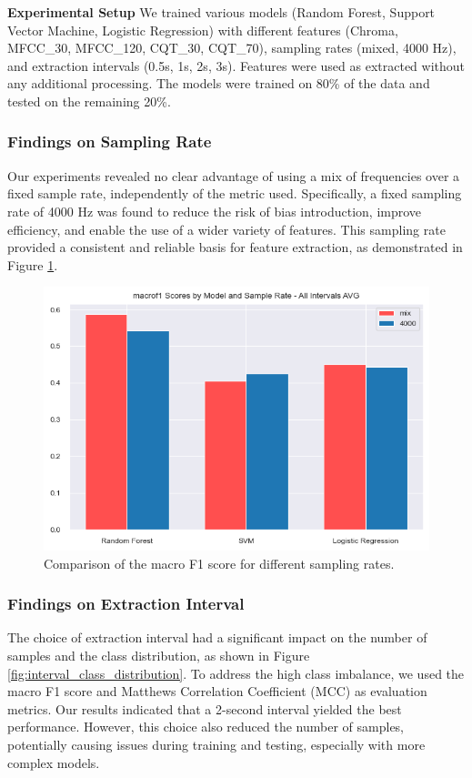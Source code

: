 \textbf{Experimental Setup}\newline
We trained various models (Random Forest, Support Vector Machine, Logistic Regression) with different features (Chroma, MFCC\_30, MFCC\_120, CQT\_30, CQT\_70),
sampling rates (mixed, 4000 Hz), and extraction intervals (0.5s, 1s, 2s, 3s). Features were used as extracted without any additional processing. 
The models were trained on 80\% of the data and tested on the remaining 20\%.

\subsubsection{Findings on Sampling Rate}
Our experiments revealed no clear advantage of using a mix of frequencies over a fixed sample rate, independently of the metric used.
Specifically, a fixed sampling rate of 4000 Hz was found to reduce the risk of bias introduction, improve efficiency, 
and enable the use of a wider variety of features. This sampling rate provided a consistent and reliable basis 
for feature extraction, as demonstrated in Figure \ref{fig:sample_rate_impact}.

\begin{figure}[H]
    \centering
    \includegraphics[width=1\columnwidth]{./images/sample_rate_impact.png}
    \caption{Comparison of the macro F1 score for different sampling rates.}
    \label{fig:sample_rate_impact}
\end{figure}

\subsubsection{Findings on Extraction Interval}
The choice of extraction interval had a significant impact on the number of samples and the class distribution, as shown in Figure \ref{fig:interval_class_distribution}.
To address the high class imbalance, we used the macro F1 score and Matthews Correlation Coefficient (MCC) as evaluation metrics. 
Our results indicated that a 2-second interval yielded the best performance. However, this choice also reduced the number of samples, 
potentially causing issues during training and testing, especially with more complex models. 

